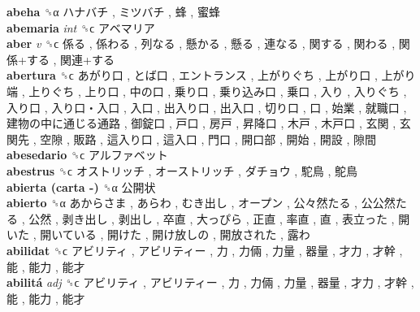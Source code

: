 \textbf{abeha} ␝α   ハナバチ ,  ミツバチ ,  蜂 ,  蜜蜂   \\
\textbf{abemaria} \emph{int}  ␝ϲ   アベマリア   \\
\textbf{aber} \emph{v}  ␝ϲ   係る ,  係わる ,  列なる ,  懸かる ,  懸る ,  連なる ,  関する ,  関わる ,  関係+する ,  関連+する   \\
\textbf{abertura} ␝ϲ   あがり口 ,  とば口 ,  エントランス ,  上がりぐち ,  上がり口 ,  上がり端 ,  上りぐち ,  上り口 ,  中の口 ,  乗り口 ,  乗り込み口 ,  乗口 ,  入り ,  入りぐち ,  入り口 ,  入り口・入口 ,  入口 ,  出入り口 ,  出入口 ,  切り口 ,  口 ,  始業 ,  就職口 ,  建物の中に通じる通路 ,  御錠口 ,  戸口 ,  房戸 ,  昇降口 ,  木戸 ,  木戸口 ,  玄関 ,  玄関先 ,  空隙 ,  販路 ,  這入り口 ,  這入口 ,  門口 ,  開口部 ,  開始 ,  開設 ,  隙間   \\
\textbf{abesedario} ␝ϲ   アルファベット   \\
\textbf{abestrus} ␝ϲ   オストリッチ ,  オーストリッチ ,  ダチョウ ,  駝鳥 ,  鴕鳥   \\
\textbf{abierta (carta -)} ␝α   公開状   \\
\textbf{abierto} ␝α   あからさま ,  あらわ ,  むき出し ,  オープン ,  公々然たる ,  公公然たる ,  公然 ,  剥き出し ,  剥出し ,  卒直 ,  大っぴら ,  正直 ,  率直 ,  直 ,  表立った ,  開いた ,  開いている ,  開けた ,  開け放しの ,  開放された ,  露わ   \\
\textbf{abilidat} ␝ϲ   アビリティ ,  アビリティー ,  力 ,  力倆 ,  力量 ,  器量 ,  才力 ,  才幹 ,  能 ,  能力 ,  能才   \\
\textbf{abilitá} \emph{adj}  ␝ϲ   アビリティ ,  アビリティー ,  力 ,  力倆 ,  力量 ,  器量 ,  才力 ,  才幹 ,  能 ,  能力 ,  能才   \\
